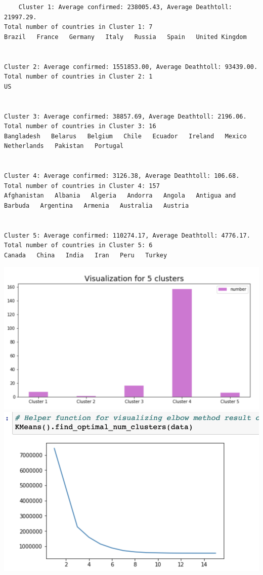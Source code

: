 \documentclass{article}
\begin{document}
\begin{verbatim}
    Cluster 1: Average confirmed: 238005.43, Average Deathtoll: 21997.29.
Total number of countries in Cluster 1: 7
Brazil   France   Germany   Italy   Russia   Spain   United Kingdom   


Cluster 2: Average confirmed: 1551853.00, Average Deathtoll: 93439.00.
Total number of countries in Cluster 2: 1
US   


Cluster 3: Average confirmed: 38857.69, Average Deathtoll: 2196.06.
Total number of countries in Cluster 3: 16
Bangladesh   Belarus   Belgium   Chile   Ecuador   Ireland   Mexico   Netherlands   Pakistan   Portugal   


Cluster 4: Average confirmed: 3126.38, Average Deathtoll: 106.68.
Total number of countries in Cluster 4: 157
Afghanistan   Albania   Algeria   Andorra   Angola   Antigua and Barbuda   Argentina   Armenia   Australia   Austria   


Cluster 5: Average confirmed: 110274.17, Average Deathtoll: 4776.17.
Total number of countries in Cluster 5: 6
Canada   China   India   Iran   Peru   Turkey   
\end{verbatim}
\includegraphics[scale=0.75]{cluster_graph2.png}\newline
\includegraphics[scale=0.75]{matplotlib.png}
\end{document}
